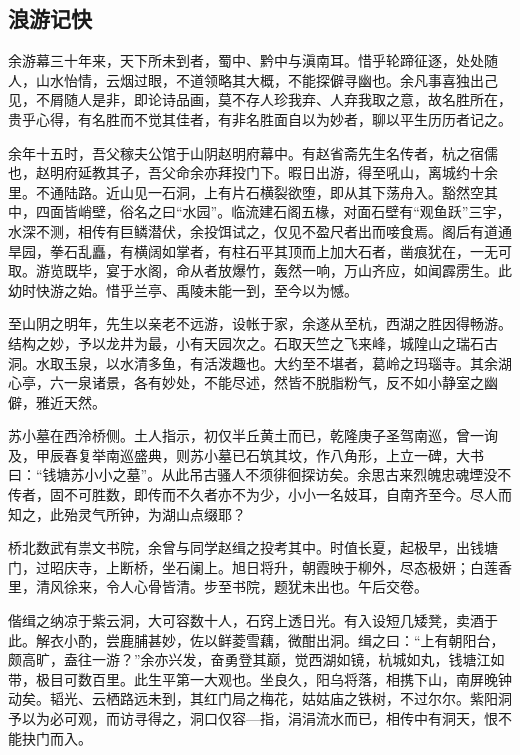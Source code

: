 \documentclass[]{article}
\begin{document}
\hypertarget{header-n23}{%
\subsection{浪游记快}\label{header-n23}}

余游幕三十年来，天下所未到者，蜀中、黔中与滇南耳。惜乎轮蹄征逐，处处随人，山水怡情，云烟过眼，不道领略其大概，不能探僻寻幽也。余凡事喜独出己见，不屑随人是非，即论诗品画，莫不存人珍我弃、人弃我取之意，故名胜所在，贵乎心得，有名胜而不觉其佳者，有非名胜面自以为妙者，聊以平生历历者记之。

余年十五时，吾父稼夫公馆于山阴赵明府幕中。有赵省斋先生名传者，杭之宿儒也，赵明府延教其子，吾父命余亦拜投门下。暇日出游，得至吼山，离城约十余里。不通陆路。近山见一石洞，上有片石横裂欲堕，即从其下荡舟入。豁然空其中，四面皆峭壁，俗名之曰``水园''。临流建石阁五椽，对面石壁有``观鱼跃''三宇，水深不测，相传有巨鳞潜伏，余投饵试之，仅见不盈尺者出而唼食焉。阁后有道通旱园，拳石乱矗，有横阔如掌者，有柱石平其顶而上加大石者，凿痕犹在，一无可取。游览既毕，宴于水阁，命从者放爆竹，轰然一响，万山齐应，如闻霹雳生。此幼时快游之始。惜乎兰亭、禹陵未能一到，至今以为憾。

至山阴之明年，先生以亲老不远游，设帐于家，余遂从至杭，西湖之胜因得畅游。结构之妙，予以龙井为最，小有天园次之。石取天竺之飞来峰，城隍山之瑞石古洞。水取玉泉，以水清多鱼，有活泼趣也。大约至不堪者，葛岭之玛瑙寺。其余湖心亭，六一泉诸景，各有妙处，不能尽述，然皆不脱脂粉气，反不如小静室之幽僻，雅近天然。

苏小墓在西泠桥侧。土人指示，初仅半丘黄土而已，乾隆庚子圣驾南巡，曾一询及，甲辰春复举南巡盛典，则苏小墓已石筑其坟，作八角形，上立一碑，大书曰：``钱塘苏小小之墓''。从此吊古骚人不须徘徊探访矣。余思古来烈魄忠魂堙没不传者，固不可胜数，即传而不久者亦不为少，小小一名妓耳，自南齐至今。尽人而知之，此殆灵气所钟，为湖山点缀耶？

桥北数武有祟文书院，余曾与同学赵缉之投考其中。时值长夏，起极早，出钱塘门，过昭庆寺，上断桥，坐石阑上。旭日将升，朝霞映于柳外，尽态极妍；白莲香里，清风徐来，令人心骨皆清。步至书院，题犹未出也。午后交卷。

偕缉之纳凉于紫云洞，大可容数十人，石窍上透日光。有入设短几矮凳，卖酒于此。解衣小酌，尝鹿脯甚妙，佐以鲜菱雪藕，微酣出洞。缉之曰：``上有朝阳台，颇高旷，盍往一游？''余亦兴发，奋勇登其巅，觉西湖如镜，杭城如丸，钱塘江如带，极目可数百里。此生平第一大观也。坐良久，阳乌将落，相携下山，南屏晚钟动矣。韬光、云栖路远未到，其红门局之梅花，姑姑庙之铁树，不过尔尔。紫阳洞予以为必可观，而访寻得之，洞口仅容---指，涓涓流水而已，相传中有洞天，恨不能抉门而入。
\end{document}
